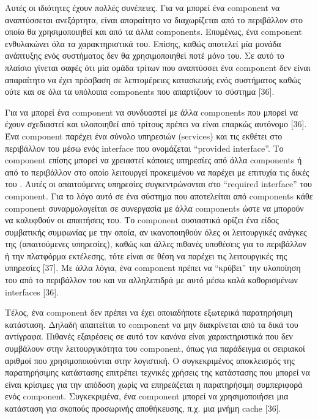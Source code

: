	Αυτές οι ιδιότητες έχουν πολλές συνέπειες. Για να μπορεί ένα component να αναπτύσσεται ανεξάρτητα, είναι απαραίτητο να διαχωρίζεται από το περιβάλλον στο οποίο θα χρησιμοποιηθεί και από τα άλλα components. Επομένως, ένα component ενθυλακώνει όλα τα χαρακτηριστικά του. Επίσης, καθώς αποτελεί μία μονάδα ανάπτυξης ενός συστήματος δεν θα χρησιμοποιηθεί ποτέ μόνο του. Σε αυτό το πλαίσιο γίνεται σαφές ότι μία ομάδα τρίτων που αναπτύσσει ένα component δεν είναι απαραίτητο να έχει πρόσβαση σε λεπτομέρειες κατασκευής ενός συστήματος καθώς ούτε και σε όλα τα υπόλοιπα components που απαρτίζουν το σύστημα [36]. 
	
	Για να μπορεί ένα component να συνδυαστεί με άλλα components που μπορεί να έχουν σχεδιαστεί και υλοποιηθεί από τρίτους πρέπει να είναι επαρκώς αυτόνομο [36]. Ένα component παρέχει ένα σύνολο υπηρεσιών (services) και τις εκθέτει στο περιβάλλον του μέσω ενός interface που ονομάζεται “provided interface”. Το component επίσης μπορεί να χρειαστεί κάποιες υπηρεσίες από άλλα components ή από το περιβάλλον στο οποίο λειτουργεί προκειμένου να παρέχει με επιτυχία τις δικές του . Αυτές οι απαιτούμενες υπηρεσίες συγκεντρώνονται στο “required interface” του component. Για το λόγο αυτό σε ένα σύστημα που αποτελείται από components κάθε component συναρμολογείται σε συνεργασία με άλλα components ώστε να μπορούν να καλυφθούν οι απαιτήσεις του. Το component ουσιαστικά ορίζει ένα είδος συμβατικής συμφωνίας με την οποία, αν ικανοποιηθούν όλες οι λειτουργικές ανάγκες της (απαιτούμενες υπηρεσίες), καθώς και άλλες πιθανές υποθέσεις για το περιβάλλον ή την πλατφόρμα εκτέλεσης, τότε είναι σε θέση να παρέχει τις λειτουργικές της υπηρεσίες [37]. Με άλλα λόγια, ένα component πρέπει να “κρύβει” την υλοποίηση του από το περιβάλλον του και να αλληλεπιδρά με αυτό μέσω καλά καθορισμένων interfaces [36].

	Τέλος, ένα component δεν πρέπει να έχει οποιαδήποτε εξωτερικά παρατηρήσιμη κατάσταση. Δηλαδή απαιτείται το component να μην διακρίνεται από τα δικά του αντίγραφα. Πιθανές εξαιρέσεις σε αυτό τον κανόνα είναι χαρακτηριστικά που δεν συμβάλουν στην λειτουργικότητα του component, όπως για παράδειγμα οι σειριακοί αριθμοί που χρησιμοποιούνται στην λογιστική. Ο συγκεκριμένος αποκλεισμός της παρατηρήσιμης κατάστασης επιτρέπει τεχνικές χρήσεις της κατάστασης που μπορεί να είναι κρίσιμες για την απόδοση χωρίς να επηρεάζεται η παρατηρήσιμη συμπεριφορά ενός component. Συγκεκριμένα, ένα component μπορεί να χρησιμοποιήσει μια κατάσταση για σκοπούς προσωρινής αποθήκευσης, π.χ. μια μνήμη cache [36].
	

